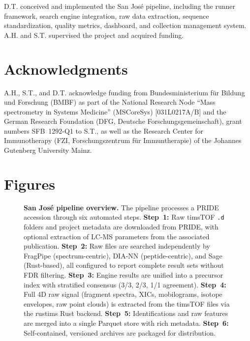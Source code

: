 \documentclass[10pt,twoside]{article}
\begin{document}
D.T. conceived and implemented the San Jos\'{e} pipeline, including the runner framework, search engine integration, raw data extraction, sequence standardization, quality metrics, dashboard, and collection management system.
A.H. and S.T. supervised the project and acquired funding.

\section{Acknowledgments}

A.H., S.T., and D.T. acknowledge funding from Bundesministerium f\"{u}r Bildung und Forschung (BMBF) as part of the National Research Node ``Mass spectrometry in Systems Medicine'' (MSCoreSys) [031L0217A/B] and the German Research Foundation (DFG, Deutsche Forschungsgemeinschaft), grant numbers SFB~1292-Q1 to S.T., as well as the Research Center for Immunotherapy (FZI, Forschungszentrum f\"{u}r Immuntherapie) of the Johannes Gutenberg University Mainz.

\section{Figures}

\begin{figure}[!ht]
    \centering
    \caption{\textbf{San Jos\'{e} pipeline overview.}
    The pipeline processes a PRIDE accession through six automated steps.
    \textbf{Step~1:} Raw timsTOF \texttt{.d} folders and project metadata are downloaded from PRIDE, with optional extraction of LC-MS parameters from the associated publication.
    \textbf{Step~2:} Raw files are searched independently by FragPipe (spectrum-centric), DIA-NN (peptide-centric), and Sage (Rust-based), all configured to report complete result sets without FDR filtering.
    \textbf{Step~3:} Engine results are unified into a precursor index with stratified consensus (3/3, 2/3, 1/1 agreement).
    \textbf{Step~4:} Full 4D raw signal (fragment spectra, XICs, mobilograms, isotope envelopes, raw point clouds) is extracted from the timsTOF files via the rustims Rust backend.
    \textbf{Step~5:} Identifications and raw features are merged into a single Parquet store with rich metadata.
    \textbf{Step~6:} Self-contained, versioned archives are packaged for distribution.
    }
    \label{fig:pipeline_overview}
\end{figure}
\end{document}
